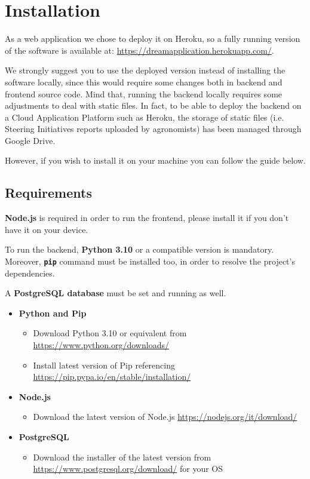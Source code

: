 \documentclass[table, 12pt]{article}
\begin{document}


\section{Installation}
As a web application we chose to deploy it on Heroku, so
a fully running version of the software is available at:
\url{https://dreamapplication.herokuapp.com/}.

We strongly suggest you to use the deployed version instead of installing the software locally, since this would require some changes both in backend and frontend source code.
Mind that, running the backend locally requires some adjustments to deal with static files. In fact, to be able to deploy the backend on a Cloud Application Platform such as Heroku, the storage of static files (i.e. Steering Initiatives reports uploaded by agronomists) has been managed through Google Drive. 

However, if you wish to install it on your machine you can follow the guide below. 

\subsection{Requirements}
\textbf{Node.js} is required in order to run the frontend, please install it if you don't
have it on your device.

To run the backend, \textbf{Python 3.10} or a compatible version is mandatory. Moreover, \texttt{\textbf{pip}} command must be installed too, in order to resolve the project's dependencies. 

A \textbf{PostgreSQL database} must be set and running as well.

\begin{itemize}
    \item \textbf{Python and Pip}
    \begin{itemize}
        \item Download Python 3.10 or equivalent from \url{https://www.python.org/downloads/}
        \item Install latest version of Pip referencing \url{https://pip.pypa.io/en/stable/installation/}
    \end{itemize}
    \item \textbf{Node.js}
    \begin{itemize}
        \item Download the latest version of Node.js \url{https://nodejs.org/it/download/}
    \end{itemize}
    \item \textbf{PostgreSQL}
    \begin{itemize}
        \item Download the installer of the latest version from \url{https://www.postgresql.org/download/} for your OS
    \end{itemize}
\end{itemize}
\end{document}
